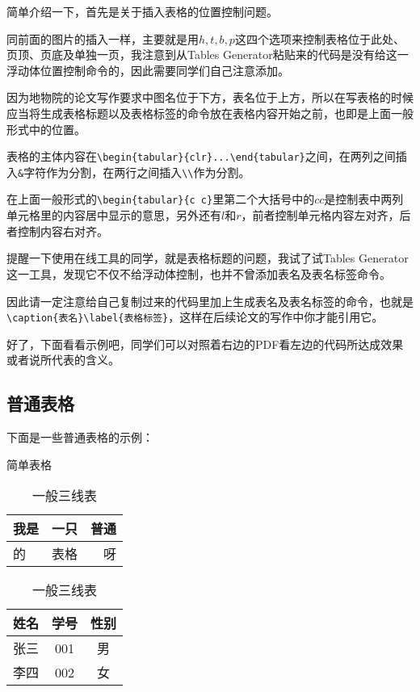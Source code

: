 简单介绍一下，首先是关于插入表格的位置控制问题。

同前面的图片的插入一样，主要就是用$h,t,b,p$这四个选项来控制表格位于此处、页顶、页底及单独一页，我注意到从Tables Generator粘贴来的代码是没有给这一浮动体位置控制命令的，因此需要同学们自己注意添加。

因为地物院的论文写作要求中图名位于下方，表名位于上方，所以在写表格的时候应当将生成表格标题以及表格标签的命令放在表格内容开始之前，也即是上面一般形式中的位置。

表格的主体内容在\verb|\begin{tabular}{clr}...\end{tabular}|之间，在两列之间插入\verb|&|字符作为分割，在两行之间插入\verb|\\|作为分割。
\par
在上面一般形式的\verb|\begin{tabular}{c c}|里第二个大括号中的$cc$是控制表中两列单元格里的内容居中显示的意思，另外还有$l$和$r$，前者控制单元格内容左对齐，后者控制内容右对齐。

提醒一下使用在线工具的同学，就是表格标题的问题，我试了试Tables Generator这一工具，发现它不仅不给浮动体控制，也并不曾添加表名及表名标签命令。\par 因此请一定注意给自己复制过来的代码里加上生成表名及表名标签的命令，也就是\verb|\caption{表名}\label{表格标签}|，这样在后续论文的写作中你才能引用它。

好了，下面看看示例吧，同学们可以对照着右边的PDF看左边的代码所达成效果或者说所代表的含义。

\subsection{普通表格}
下面是一些普通表格的示例：

\begin{table}[ht]
\begin{minipage}[t]{0.5\textwidth}
  \centering
  \caption{简单表格}
  \label{tab:1}
  \begin{tabular}{|l|c|r|}
    \hline
    我是& 一只 & 普通\\
    \hline
    的& 表格& 呀\\
    \hline
  \end{tabular}
\end{minipage}
\begin{minipage}[t]{0.5\textwidth}
  \centering
  \caption{一般三线表}
  \label{tab:2}
  \begin{tabular}{ccc}
    \hline
    姓名& 学号& 性别\\
    \hline
    张三& 001& 男\\
    李四& 002& 女\\
    \hline
  \end{tabular}
\end{minipage}  
\end{table}

